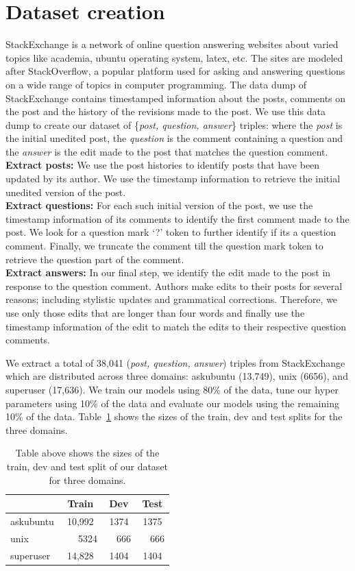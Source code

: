 \documentclass[11pt]{report}
\begin{document}
\section{Dataset creation}\label{dataset_creation}
StackExchange is a network of online question answering websites about varied topics like academia, ubuntu operating system, latex, etc. The sites are modeled after StackOverflow, a popular platform used for asking and answering questions on a wide range of topics in computer programming. The data dump of StackExchange contains timestamped information about the posts, comments on the post and the history of the revisions made to the post. We use this data dump to create our dataset of \{\textit{post, question, answer}\} triples: where the \textit{post} is the initial unedited post, the \textit{question} is the comment containing a question and the \textit{answer} is the edit made to the post that matches the question comment. \\
\textbf{Extract posts:} We use the post histories to identify posts that have been updated by its author. We use the timestamp information to retrieve the initial unedited version of the post.\\
\textbf{Extract questions:} For each such initial version of the post, we use the timestamp information of its comments to identify the first comment made to the post. We look for a question mark `?' token to further identify if its a question comment. Finally, we truncate the comment till the question mark token to retrieve the question part of the comment.\\
\textbf{Extract answers:} In our final step, we identify the edit made to the post in response to the question comment. Authors make edits to their posts for several reasons; including stylistic updates and grammatical corrections. Therefore, we use only those edits that are longer than four words and finally use the timestamp information of the edit to match the edits to their respective question comments.

We extract a total of 38,041 (\textit{post, question, answer}) triples from StackExchange which are distributed across three domains: askubuntu (13,749), unix (6656), and superuser (17,636). We train our models using 80\% of the data, tune our hyper parameters using 10\% of the data and evaluate our models using the remaining 10\% of the data. Table~\ref{data_statistics} shows the sizes of the train, dev and test splits for the three domains. 

\begin{table}
\centering
\begin{tabular}{lccc}
\toprule
& Train & Dev & Test  \\
\midrule
askubuntu & 10,992 & 1374 & 1375\\
unix & ~~~5324 & ~~666 & ~~666 \\
superuser & 14,828 & 1404 & 1404 \\
\bottomrule
\end{tabular}
\caption{Table above shows the sizes of the train, dev and test split of our dataset for three domains.}
\label{data_statistics}
\end{table}
\end{document}
